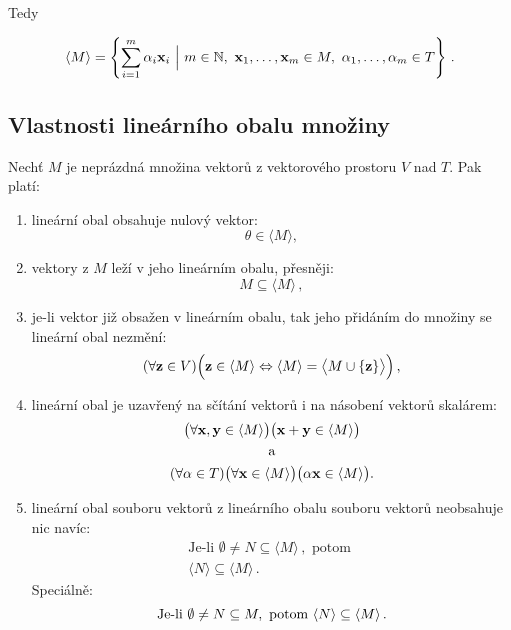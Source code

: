 Tedy

\[ \langle  M \rangle
      =\left\{\sum_{i=1}^{m}\alpha_{i}\vx_{i}\ \Big|\ m\in \N,\ \vx_1,\dots,\vx_m\in M,\ \alpha_1,\dots,\alpha_m\in T\right\}\,. \]

\subsection*{Vlastnosti lineárního obalu množiny}

Nechť $M$ je neprázdná množina vektorů z vektorového prostoru $V$ nad $T$. Pak
platí:

\begin{enumerate}
      \item lineární obal obsahuje nulový vektor:
            \[ \theta\in \langle M \rangle , \]
      \item vektory z $M$ leží v jeho lineárním obalu, přesněji:
            \[ M \subseteq \langle M \rangle\,, \]
      \item je-li vektor již obsažen v lineárním obalu, tak jeho přidáním do množiny se
            lineární obal nezmění:
            \[ (\forall \mathbf{z}\in V)\Big(\mathbf{z}\in\langle M \rangle    \Leftrightarrow \langle  M  \rangle =\big\langle  M\cup\{\mathbf{z}\}  \big\rangle\Big)\,, \]
      \item lineární obal je uzavřený na sčítání vektorů i na násobení vektorů skalárem:
            \begin{gather*}
                  \big(\forall\mathbf{x},\mathbf{y}\in\langle  M \rangle\big)\big(\mathbf{x}+\mathbf{y}\in\langle M \rangle\big)\\
                  \quad\text{a}\quad\\
                  (\forall\alpha\in T)\big(\forall\mathbf{x}\in\langle M \rangle\big)\big(\alpha \mathbf{x}\in\langle M \rangle\big) .
            \end{gather*}
      \item lineární obal souboru vektorů z lineárního obalu souboru vektorů neobsahuje nic
            navíc:
            \begin{gather*}
                  \text{Je-li } \emptyset \neq N\subseteq \langle  M \rangle\,,\text{ potom }\\
                  \langle  N  \rangle \subseteq \langle  M \rangle\,.
            \end{gather*}
            Speciálně:
            \[ \text{Je-li } \emptyset \neq N\subseteq M,\text{ potom }\\
                  \langle  N  \rangle \subseteq \langle  M \rangle\,. \]
\end{enumerate}

